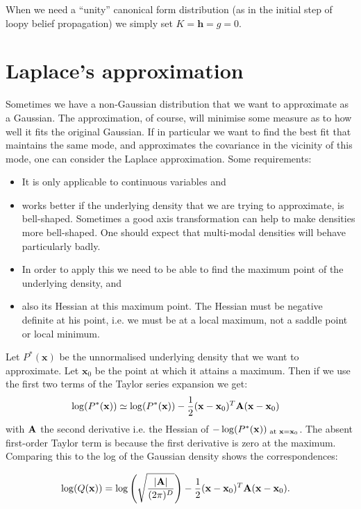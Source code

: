 When we need a ``unity'' canonical form distribution (as in the
initial step of loopy belief propagation) we simply set $K=\mathbf{h}=g=0$.


\section{Laplace's approximation}

Sometimes we have a non-Gaussian distribution that we want to approximate
as a Gaussian. The approximation, of course, will minimise some measure
as to how well it fits the original Gaussian. If in particular we
want to find the best fit that maintains the same mode, and approximates
the covariance in the vicinity of this mode, one can consider the
Laplace approximation. Some requirements:
\begin{itemize}
\item It is only applicable to continuous variables and
\item works better if the underlying density that we are trying to approximate,
is bell-shaped. Sometimes a good axis transformation can help to make
densities more bell-shaped. One should expect that multi-modal densities
will behave particularly badly.
\item In order to apply this we need to be able to find the maximum point
of the underlying density, and
\item also its Hessian at this maximum point. The Hessian must be negative
definite at his point, i.e. we must be at a local maximum, not a saddle
point or local minimum.
\end{itemize}
Let $P^{*}(\mathbf{x})$ be the unnormalised underlying density that
we want to approximate. Let $\mathbf{x}_{0}$ be the point at which
it attains a maximum. Then if we use the first two terms of the Taylor
series expansion we get:
\begin{align}
\log(P^{*}(\mathbf{x})) & \simeq\log(P^{*}(\mathbf{x}))-\frac{1}{2}({\mathbf{x}}-{\mathbf x}_{0})^{T}{\mathbf A}({\mathbf x}-{\mathbf x}_{0})
\end{align}
 with ${\mathbf A}$ the second derivative i.e. the Hessian of $-\log(P^{*}({\mathbf x}))_{\text{ at }{\mathbf x}={\mathbf x}_{0}}$.
The absent first-order Taylor term is because the first derivative
is zero at the maximum. Comparing this to the log of the Gaussian
density shows the correspondences:

\begin{align}
\log(Q({\mathbf x})) & =\log\left(\sqrt{\frac{|{\mathbf A}|}{(2\pi)^{D}}}\right)-\frac{1}{2}({\mathbf x}-{\mathbf x}_{0})^{T}{\mathbf A}({\mathbf x}-{\mathbf x}_{0}).
\end{align}


